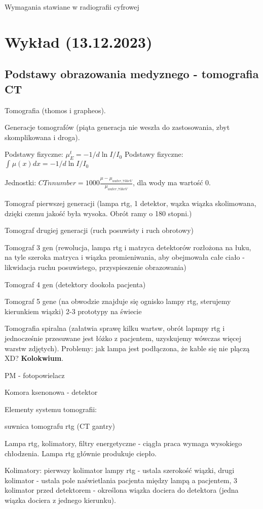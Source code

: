 \documentclass{article}
\begin{document}
Wymagania stawiane w radiografii cyfrowej

\section{Wykład (13.12.2023)}

\subsection{Podstawy obrazowania medyznego - tomografia CT}

Tomografia (thomos i grapheos).

Generacje tomografów (piąta generacja nie weszła do zastosowania, zbyt skomplikowana i droga).

Podstawy fizyczne: $\mu_E^t = -1/d \ln{I/I_0}$
Podstawy fizyczne: $\int_{}^{}\mu(x)dx = -1/d \ln{I/I_0}$

Jednostki: $CTnnumber = 1000 \frac{\mu - \mu_{water,73keV}}{\mu_{water,73keV}}$, dla wody ma wartość 0.

Tomograf pierwszej generacji (lampa rtg, 1 detektor, wązka wiązka skolimowana, dzięki czemu jakość była wysoka. Obrót ramy o 180 stopni.)

Tomograf drugiej generacji (ruch posuwisty i ruch obrotowy)

Tomograf 3 gen (rewolucja, lampa rtg i matryca detektorów rozłożona na łuku, na tyle szeroka matryca i wiązka promieniwania, aby obejmowała całe ciało - likwidacja ruchu posuwistego, przyspieszenie obrazowania)

Tomograf 4 gen (detektory dookoła pacjenta)

Tomograf 5 gene (na obwodzie znajduje się ognisko lampy rtg, sterujemy kierunkiem wiązki) 2-3 prototypy na świecie

Tomografia spiralna (załatwia sprawę kilku wartsw, obrót lapmpy rtg i jednocześnie przesuwane jest łóżko z pacjentem, uzyskujemy wówczas więcej warstw zdjętych). Problemy: jak lampa jest podłączona, że kable się nie plączą XD? \textbf{Kolokwium}. 

PM - fotopowielacz

Komora ksenonowa - detektor

Elementy systemu tomografii: 

suwnica tomografu rtg (CT gantry)

Lampa rtg, kolimatory, filtry energetyczne - ciągła praca wymaga wysokiego chłodzenia. Lampa rtg głównie produkuje ciepło.

Kolimatory: pierwszy kolimator lampy rtg - ustala szerokość wiązki, drugi kolimator - ustala pole naświetlania pacjenta między lampą a pacjentem, 3 kolimator przed detektorem - określona wiązka dociera do detektora (jedna wiązka dociera z jednego kierunku).
\end{document}
